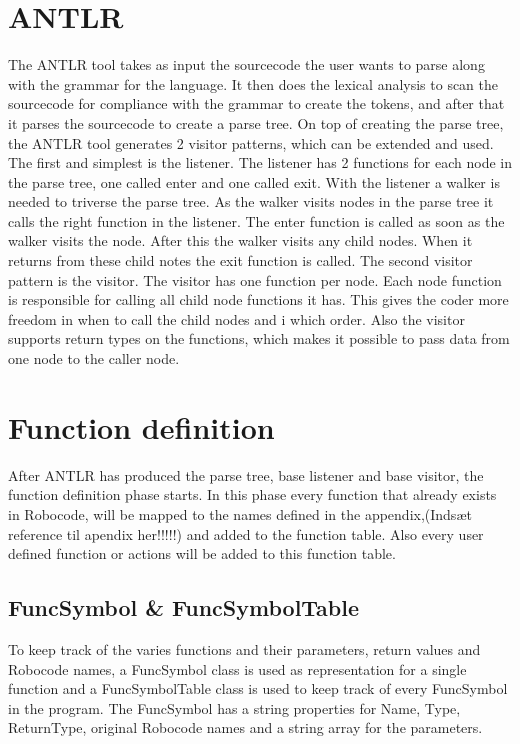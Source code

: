 \section{ANTLR}
The ANTLR tool takes as input the sourcecode the user wants to parse along with the grammar for the language. It then does the lexical analysis to scan the sourcecode for compliance with the grammar to create the tokens, and after that it parses the sourcecode to create a parse tree. On top of creating the parse tree, the ANTLR tool generates 2 visitor patterns, which can be extended and used. The first and simplest is the listener. The listener has 2 functions for each node in the parse tree, one called enter and one called exit. With the listener a walker is needed to triverse the parse tree. As the walker visits nodes in the parse tree it calls the right function in the listener. The enter function is called as soon as the walker visits the node. After this the walker visits any child nodes. When it returns from these child notes the exit function is called. The second visitor pattern is the visitor. The visitor has one function per node. Each node function is responsible for calling all child node functions it has. This gives the coder more freedom in when to call the child nodes and i which order. Also the visitor supports return types on the functions, which makes it possible to pass data from one node to the caller node. 


\section{Function definition}
After ANTLR has produced the parse tree, base listener and base visitor, the function definition phase starts. In this phase every function that already exists in Robocode, will be mapped to the names defined in the appendix,(Indsæt reference til apendix her!!!!!) and added to the function table. Also every user defined function or actions will be added to this function table. 

\subsection{FuncSymbol \& FuncSymbolTable}
To keep track of the varies functions and their parameters, return values and Robocode names, a FuncSymbol class is used as representation for a single function and a FuncSymbolTable class is used to keep track of every FuncSymbol in the program.
The FuncSymbol has a string properties for Name, Type, ReturnType, original Robocode names and a string array for the parameters.

